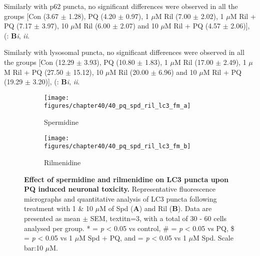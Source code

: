 Similarly with p62 puncta, no significant differences were observed in all the groups [Con (3.67 $\pm$ 1.28), PQ (4.20 $\pm$ 0.97), 1 $\mu$M Ril (7.00 $\pm$ 2.02), 1 $\mu$M Ril + PQ (7.17 $\pm$ 3.97), 10 $\mu$M Ril (6.00 $\pm$ 2.07) and 10 $\mu$M Ril + PQ (4.57 $\pm$ 2.06)], (: \textbf{B}\textit{i}, \textit{ii}.

Similarly with lysosomal puncta, no significant differences were observed in all the groups [Con (12.29 $\pm$ 3.93), PQ (10.80 $\pm$ 1.83), 1 $\mu$M Ril (17.00 $\pm$ 2.49), 1 $\mu$M Ril + PQ (27.50 $\pm$ 15.12), 10 $\mu$M Ril (20.00 $\pm$ 6.96) and 10 $\mu$M Ril + PQ (19.29 $\pm$ 3.20)], (: \textbf{B}\textit{i}, \textit{ii}.

\begin{figure}[!htbp]
  \center
  \begin{subfigure}[b]{0.495\linewidth}
    \texttt{[image: figures/chapter40/40\_pq\_spd\_ril\_lc3\_fm\_a]}
    \caption{Spermidine}
  \end{subfigure}
  \begin{subfigure}[b]{0.495\linewidth}
    \texttt{[image: figures/chapter40/40\_pq\_spd\_ril\_lc3\_fm\_b]}
    \caption{Rilmenidine}
  \end{subfigure}
  \caption[Effect of spermidine and rilmenidine on LC3 puncta upon PQ induced neuronal toxicity]{\textbf{Effect of spermidine and rilmenidine on LC3 puncta upon PQ induced neuronal toxicity.} Representative fluorescence micrographs and quantitative analysis of LC3 puncta following treatment with 1 \& 10 $\mu$M of Spd (\textbf{A}) and Ril (\textbf{B}). Data are presented as mean $\pm$ SEM, textit{n}=3, with a total of 30 - 60 cells analysed per group. * = \textit{p} < 0.05 vs control, \# = \textit{p} < 0.05 vs PQ, \$ = \textit{p} < 0.05 vs 1 $\mu$M Spd + PQ, and \@ = \textit{p} < 0.05 vs 1 $\mu$M Spd. Scale bar:10 $\mu$M.}
  \label{fig:40_pq_spd_ril_lc3_fm_a}
\end{figure}

